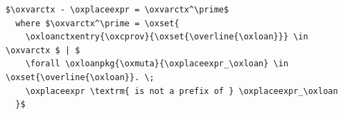 \begin{lstlisting}
$\oxvarctx - \oxplaceexpr = \oxvarctx^\prime$
  where $\oxvarctx^\prime = \oxset{
    \oxloanctxentry{\oxcprov}{\oxset{\overline{\oxloan}}} \in \oxvarctx $ | $
    \forall \oxloanpkg{\oxmuta}{\oxplaceexpr_\oxloan} \in \oxset{\overline{\oxloan}}. \;
    \oxplaceexpr \textrm{ is not a prefix of } \oxplaceexpr_\oxloan
  }$
\end{lstlisting}

